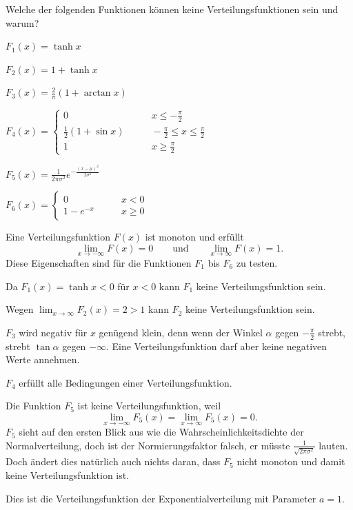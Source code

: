 Welche der folgenden Funktionen können keine Verteilungsfunktionen sein
und warum?
\begin{teilaufgaben}
\item $F_1(x)=\tanh x$
\item $F_2(x)=1+\tanh x$
\item $F_3(x)=\frac2{\pi}(1+\arctan x)$
\item $F_4(x)=\begin{cases}
0&\qquad x\le -\frac{\pi}2\\
\frac12(1+\sin x)&\qquad-\frac{\pi}2\le x\le \frac{\pi}2\\
1&\qquad x\ge \frac{\pi}2
\end{cases}$
\item $F_5(x)=\frac1{2\pi\sigma^2}e^{-\frac{(x-\mu)^2}{2\sigma^2}}$
\item $F_6(x)=\begin{cases}0&\qquad x<0\\1-e^{-x}&\qquad x\ge 0\end{cases}$
\end{teilaufgaben}


\begin{loesung}
Eine Verteilungsfunktion $F(x)$ ist monoton und erfüllt
\[
\lim_{x\to-\infty}F(x)=0
\qquad\text{und}\qquad
\lim_{x\to\infty}F(x)=1.
\]
Diese Eigenschaften sind für die
Funktionen $F_1$ bis $F_6$ zu testen.
\begin{teilaufgaben}
\item Da $F_1(x)=\tanh x<0$ für $x<0$ kann $F_1$ keine Verteilungsfunktion sein.
\item Wegen $\lim_{x\to\infty}F_2(x)=2>1$ kann $F_2$ keine Verteilungsfunktion sein.
\item $F_3$ wird negativ für $x$ genügend klein, denn wenn der Winkel
$\alpha$ gegen $-\frac{\pi}2$ strebt, strebt $\tan\alpha$ gegen $-\infty$.
Eine Verteilungsfunktion darf aber keine negativen Werte annehmen.
\item $F_4$ erfüllt alle Bedingungen einer Verteilungsfunktion.
\item Die Funktion $F_5$ ist keine Verteilungsfunktion, weil
\[
\lim_{x\to-\infty}F_5(x)=\lim_{x\to\infty}F_5(x)=0.
\]
$F_5$ sieht auf den ersten
Blick aus wie die Wahrscheinlichkeitsdichte der Normalverteilung, doch ist
der Normierungsfaktor falsch, er müsste $\frac1{\sqrt{2\pi\sigma^2}}$ lauten.
Doch ändert dies natürlich auch nichts daran, dass $F_5$ nicht monoton und damit
keine Verteilungsfunktion ist.
\item Dies ist die Verteilungsfunktion der Exponentialverteilung mit Parameter $a=1$.
\qedhere
\end{teilaufgaben}
\end{loesung}

